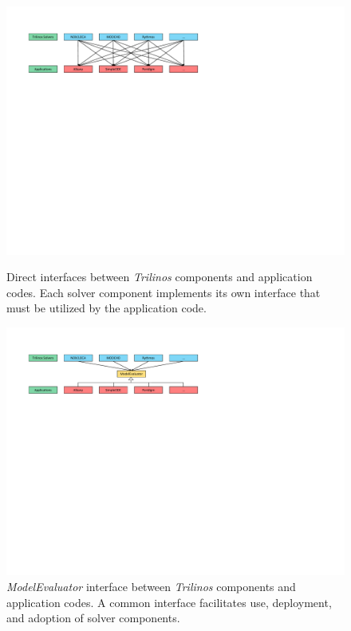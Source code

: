 \documentclass[pdf,ps2pdf,12pt,report]{SANDreport}
\theoremstyle{plain}
\theoremstyle{definition}
\theoremstyle{remark}
\numberwithin{equation}{section}
\begin{document}
\begin{figure}[htbp]
  \begin{minipage}[b]{\linewidth}
    \centering
    \includegraphics[width=\linewidth]{Interfaces1}
    \caption{Direct interfaces between \emph{Trilinos} components and application codes. Each solver component implements its own interface that must be utilized by the application code.}
    \label{fig:ACInterfaces1}
  \end{minipage}
  \begin{minipage}[b]{\linewidth}
    \centering
    \includegraphics[width=\linewidth]{Interfaces2}
    \caption{\emph{ModelEvaluator} interface between \emph{Trilinos} components and application codes. A common interface facilitates use, deployment, and adoption of solver components.}
    \label{fig:ACInterfaces2}
  \end{minipage}
\end{figure}
\end{document}
